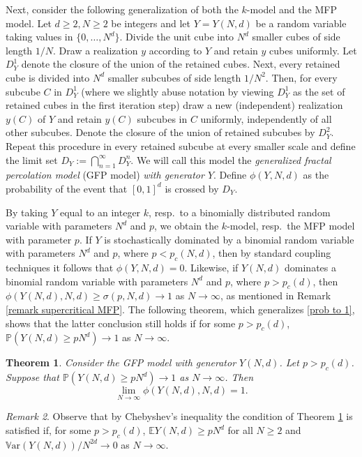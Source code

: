 \documentclass[11pt,a4paper]{article}
\newcommand{\IE}{\ensuremath{\mathbb{E}}}
\newcommand{\IV}{\ensuremath{\mathbb{V}}}
\newcommand{\pc}{\ensuremath{p_{c}(d)}}
\newcommand{\IP}{\ensuremath{\mathbb{P}}}
\newcommand{\Var}{\ensuremath{\IV\text{ar}}}
\newtheorem{theorem}{Theorem}[section]
\theoremstyle{remark}
\newtheorem{remark}[theorem]{Remark}
\begin{document}
Next, consider the following generalization of both the $k$-model and the MFP model.
Let $d\geq2, N \geq 2$ be integers and let $Y=Y(N,d)$ be a random variable taking values in $\{0,\ldots,N^d\}$. Divide the unit cube into $N^d$ smaller cubes of side length $1/N$. Draw a realization $y$ according to $Y$ and retain $y$ cubes uniformly. Let $D^1_{Y}$ denote the closure of the union of the retained cubes. Next, every retained cube is divided into $N^d$ smaller subcubes of side length $1/N^2$. Then, for every subcube $C$ in $D^{1}_{Y}$ (where we slightly abuse notation by viewing $D^1_{Y}$ as the set of retained cubes in the first iteration step) draw a new (independent) realization $y(C)$ of $Y$ and retain $y(C)$ subcubes in $C$ uniformly, independently of all other subcubes. Denote the closure of the union of retained subcubes by $D^2_{Y}$. Repeat this procedure in every retained subcube at every smaller scale and define the limit set $D_{Y}:= \bigcap_{n=1}^{\infty}D^n_{Y}$. We will call this model the \emph{generalized fractal percolation model} (GFP model) \emph{with generator $Y$}. Define $\phi(Y,N,d)$ as the probability of the event that $[0,1]^d$ is crossed by $D_{Y}$. 


By taking $Y$ equal to an integer $k$, resp.\ to a binomially distributed random variable with parameters $N^d$ and $p$, we obtain the $k$-model, resp.\ the MFP model with parameter $p$. If $Y$ is stochastically dominated by a binomial random variable with parameters $N^d$ and $p$, where $p<p_c(N,d)$, then by standard coupling techniques it follows that $\phi(Y,N,d)=0$. Likewise, if $Y(N,d)$ dominates a binomial random variable with parameters $N^d$ and $p$, where $p>\pc$, then $\phi(Y(N,d),N,d) \geq \sigma(p,N,d) \to 1$ as $N \to \infty$, as mentioned in Remark \ref{remark supercritical MFP}. The following theorem, which generalizes \eqref{prob to 1}, shows that the latter conclusion still holds if for some $p>\pc$, $\IP(Y(N,d) \geq p N^d)\to 1$ as $N \to \infty$.


\begin{theorem}\label{thm generalization}
 Consider the GFP model with generator $Y(N,d)$. Let $p>\pc$. Suppose that $\IP(Y(N,d) \geq pN^{d}) \to 1$ as $N \to \infty$. Then 
\[
\lim_{N \to \infty} \phi(Y(N,d),N,d) = 1.
\]
\end{theorem}


\begin{remark} Observe that by Chebyshev's inequality the condition of Theorem \ref{thm generalization} is satisfied if, for some $p>\pc$, $\IE Y(N,d) \geq p N^d$ for all $N \geq 2$ and $\Var(Y(N,d))/N^{2d} \to 0$ as $N \to \infty$.
\end{remark}
\end{document}
